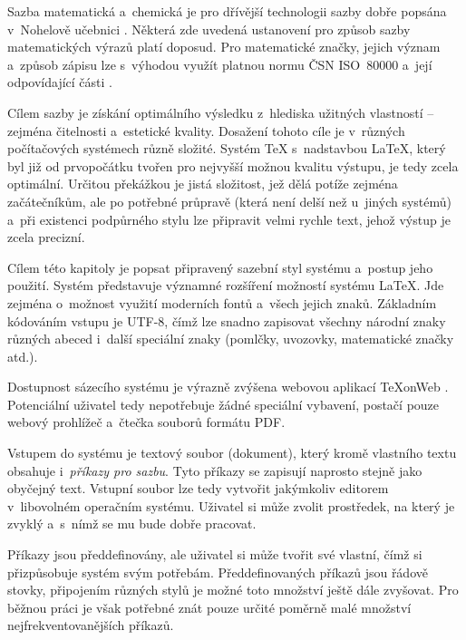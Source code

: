\documentclass[twoside,12pt]{article}
\begin{document}
Sazba matematická a~chemická je pro dřívější technologii sazby dobře popsána
v~Nohelově učebnici \cite{Nohel}. Některá zde uvedená ustanovení pro způsob
sazby matematických výrazů platí doposud. Pro matematické značky, jejich
význam a~způsob zápisu lze s~výhodou využít platnou normu ČSN ISO~80000 a~její
odpovídající části \cite{csn80000, csn80000m}.


Cílem sazby je získání optimálního výsledku z~hlediska užitných vlastností --
zejména čitelnosti a~estetické kvality. Dosažení tohoto cíle je v~různých
počítačových systémech různě složité. Systém \TeX{} s~nadstavbou \LaTeX, který
byl již od prvopočátku tvořen pro nejvyšší možnou kvalitu výstupu, je tedy
zcela optimální. Určitou překážkou je jistá složitost, jež dělá potíže zejména
začátečníkům, ale po potřebné průpravě (která není delší než u~jiných systémů)
a~při existenci podpůrného stylu lze připravit velmi rychle text, jehož výstup
je zcela precizní.

Cílem této kapitoly je popsat připravený sazební styl systému \XeLaTeX{}
a~postup jeho použití. Systém \XeLaTeX{} představuje významné rozšíření možností
systému \LaTeX. Jde zejména o~možnost využití moderních fontů a~všech jejich
znaků. Základním kódováním vstupu je UTF-8, čímž lze snadno zapisovat všechny
národní znaky různých abeced i~další speciální znaky (pomlčky, uvozovky,
matematické značky atd.).

Dostupnost sázecího systému je výrazně zvýšena webovou aplikací \TeX onWeb
\cite{texonweb}. Potenciální uživatel tedy nepotřebuje žádné speciální vybavení,
postačí pouze webový prohlížeč a~čtečka souborů formátu PDF.

Vstupem do systému je textový soubor (dokument), který kromě vlastního textu
obsahuje i~\textit{příkazy pro sazbu}. Tyto příkazy se zapisují naprosto
stejně jako obyčejný text. Vstupní soubor lze tedy vytvořit jakýmkoliv
editorem v~libovolném operačním systému. Uživatel si může zvolit prostředek,
na který je  zvyklý a~s~nímž se mu bude dobře pracovat.

Příkazy jsou předdefinovány, ale uživatel si může tvořit své vlastní, čímž si
přizpůsobuje systém svým potřebám. Předdefinovaných příkazů jsou řádově
stovky, připojením různých stylů je možné toto množství ještě dále zvyšovat.
Pro běžnou práci je však potřebné znát pouze určité poměrně malé množství
nejfrekventovanějších příkazů.
\end{document}
